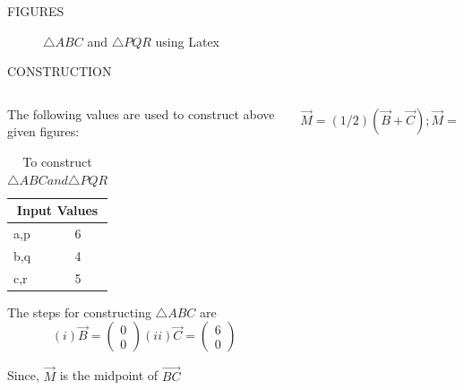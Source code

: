 \documentclass[11pt]{beamer}
\begin{document}
\begin{frame}{FIGURES}
\begin{figure}
\resizebox{10cm}{!}{}
\caption{$\triangle ABC$ and $\triangle PQR$ using Latex}
\end{figure}
\end{frame}

\begin{frame}{CONSTRUCTION}
\begin{columns}
\begin{column}{0.5\textwidth}
The following values are used to construct above given figures:
\begin{table}[htbp]
\centering
\resizebox{0.5\textwidth}{!}
{\begin{minipage}{\textwidth}
\begin{tabular}{ |p{3cm}|p{3cm}|  }
\hline
 \multicolumn{2}{|c|}{Input Values} \\
\hline
a,p & 6\\
\hline
b,q & 4\\
\hline
c,r & 5 \\
\hline
\end{tabular}
\end{minipage}}
\caption{\tiny To construct $\triangle ABC and \triangle PQR $}
\end{table}



The steps for constructing $\triangle ABC$ are
\newline
$$(i)\vec{B}= \begin{pmatrix}0\\0\end{pmatrix}
(ii)\vec{C}=\begin{pmatrix}6\\0\end{pmatrix}$$

Since, $\vec{M}$ is the midpoint of $\vec{BC}$
\end{column}
\begin{column}{0.5\textwidth}
$$\vec{M}=(1/2)(\vec{B}+\vec{C});
\vec{M}=\begin{pmatrix}3\\0\end{pmatrix}$$


\end{column}
\end{columns}
\end{frame}
\end{document}
